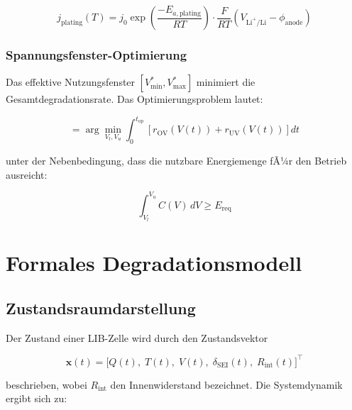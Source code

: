 ﻿\documentclass[12pt,a4paper]{article}
\begin{document}
	\begin{equation}
		j_\mathrm{plating}(T) = j_0 \exp\!\left(\frac{-E_{a,\mathrm{plating}}}{RT}\right) \cdot
		\frac{F}{RT}\left(V_\mathrm{Li^+/Li} - \phi_\mathrm{anode}\right)
		\label{eq:li_plating}
	\end{equation}
	
	\subsubsection{Spannungsfenster-Optimierung}
	
	Das effektive Nutzungsfenster $[V_\mathrm{min}^*, V_\mathrm{max}^*]$ minimiert
	die Gesamtdegradationsrate. Das Optimierungsproblem lautet:
	
	\begin{equation}
		[V_\mathrm{min}^*, V_\mathrm{max}^*] = \arg\min_{V_l, V_u}
		\int_0^{t_\mathrm{op}} \left[r_\mathrm{OV}(V(t)) + r_\mathrm{UV}(V(t))\right] dt
		\label{eq:voltage_window_opt}
	\end{equation}
	
	unter der Nebenbedingung, dass die nutzbare Energiemenge fÃ¼r den Betrieb
	ausreicht:
	
	\begin{equation}
		\int_{V_l}^{V_u} C(V)\, dV \geq E_\mathrm{req}
	\end{equation}
	
	\section{Formales Degradationsmodell}
	\label{sec:degradationsmodell}
	
	\subsection{Zustandsraumdarstellung}
	
	Der Zustand einer LIB-Zelle wird durch den Zustandsvektor
	
	\begin{equation}
		\mathbf{x}(t) = \bigl[Q(t),\; T(t),\; V(t),\; \delta_\mathrm{SEI}(t),\; R_\mathrm{int}(t)\bigr]^\top
		\label{eq:state_vector}
	\end{equation}
	
	beschrieben, wobei $R_\mathrm{int}$ den Innenwiderstand bezeichnet. Die
	Systemdynamik ergibt sich zu:
	
\end{document}
